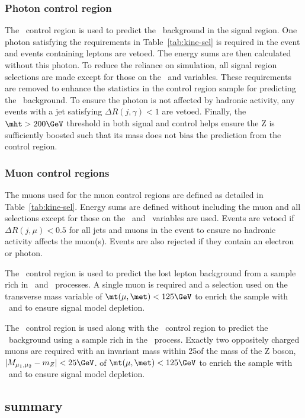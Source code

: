 \subsubsection{Photon control region}
The \gj~control region is used to predict the \znunu~background in the signal region.
One photon satisfying the requirements in Table~\ref{tab:kine-sel} is required in the 
event and events containing leptons are vetoed. The energy sums are then calculated without this photon. To reduce the reliance on simulation, 
all signal region selections are made except for those on the \bdphi~and \alphat variables.
These requirements are removed to enhance the statistics in the control region sample 
for predicting the \znunu~background. To ensure the photon is not affected by hadronic
activity, any events with a jet satisfying $\Delta R(j,\gamma) < 1$ are vetoed. Finally,
the $\mht > 200 \GeV$ threshold in both signal and control helps ensure the Z is sufficiently
boosted such that its mass does not bias the prediction from the \gj control region. 
\subsubsection{Muon control regions}
The muons used for the muon control regions are defined as detailed in
Table~\ref{tab:kine-sel}. Energy sums are defined without including the muon 
and all selections except for those on the \bdphi~and \alphat~variables are used.
Events are vetoed if $\Delta R(j,\mu) < 0.5$ for all jets and muons in the event to
ensure no hadronic activity affects the muon(s). Events are also rejected if they 
contain an electron or photon.

The \mj~control region is used to predict the lost lepton background from 
a sample rich in \wj~and \ttbar~processes. A single muon is required and a selection used on the transverse mass variable
of $\mt(\mu,\met) < 125\GeV$ to enrich the sample with \wj~and to ensure signal model depletion.

The \mmj~control region is used along with the \gj~control region to predict the \znunu~background
using a sample rich in the \zmmj~process. Exactly two oppositely charged muons are required with
an invariant mass within 25\GeV of the mass of the Z boson, $|M_{\mu_1,\mu_2} - m_Z| < 25\GeV$.
of $\mt(\mu,\met) < 125\GeV$ to enrich the sample with \wj~and to ensure signal model depletion.

\subsection{summary}


